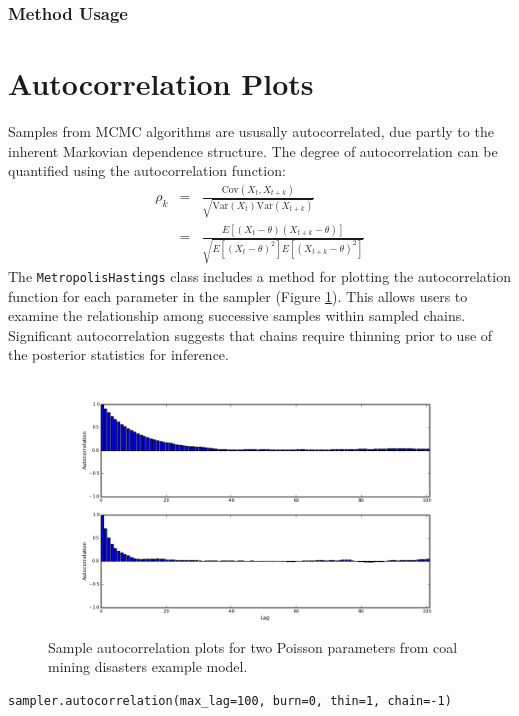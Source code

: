 \documentclass[]{book}
\begin{document}
\subsubsection{Method Usage}
\section{Autocorrelation Plots}

Samples from MCMC algorithms are ususally autocorrelated, due partly to the inherent Markovian dependence structure. The degree of autocorrelation can be quantified using the autocorrelation function: 
\begin{eqnarray*}
	\rho_k &=& \frac{\mbox{Cov}(X_t, X_{t+k})}{\sqrt{\mbox{Var}(X_t)\mbox{Var}(X_{t+k})}} \\
			&=& \frac{E[(X_t - \theta)(X_{t+k} - \theta)]}{\sqrt{E[(X_t - \theta)^2] E[(X_{t+k} - \theta)^2]}}
\end{eqnarray*}
The \verb=MetropolisHastings= class includes a method for plotting the autocorrelation function for each parameter in the sampler (Figure \ref{fig:autocorr}). This allows users to examine the relationship among successive samples within sampled chains. Significant autocorrelation suggests that chains require thinning prior to use of the posterior statistics for inference.

\begin{figure}[htbp]
		\begin{center}
		\includegraphics[scale=0.4]{autocorr.png}
	\end{center}
	\caption{Sample autocorrelation plots for two Poisson parameters from coal mining disasters example model.}
	\label{fig:autocorr}
\end{figure}

\begin{verbatim}
sampler.autocorrelation(max_lag=100, burn=0, thin=1, chain=-1)
\end{verbatim}
\end{document}
